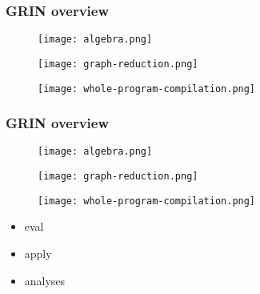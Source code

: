 \documentclass[bigger]{beamer}
\begin{document}
\begin{frame}[fragile]
\frametitle{GRIN overview}
\begin{center}

	\begin{minipage}{0.30\textwidth}
		\begin{figure}
			\texttt{[image: algebra.png]}
		\end{figure}
	\end{minipage}
	\hfill
	\begin{minipage}{0.30\textwidth}
		\begin{figure}
			\texttt{[image: graph-reduction.png]}
		\end{figure}
	\end{minipage}
	\hfill
	\begin{minipage}{0.30\textwidth}
		\begin{figure}
			\texttt{[image: whole-program-compilation.png]}
		\end{figure}
	\end{minipage}

\end{center}
\end{frame}

\begin{frame}[fragile]
\frametitle{GRIN overview}
\begin{center}

	\begin{minipage}{0.30\textwidth}
		\begin{figure}
			\texttt{[image: algebra.png]}
		\end{figure}
	\end{minipage}
	\hfill
	\begin{minipage}{0.30\textwidth}
		\begin{figure}
			\texttt{[image: graph-reduction.png]}
		\end{figure}
	\end{minipage}
	\hfill
	\begin{minipage}{0.30\textwidth}
		\vspace{1cm}
		\begin{figure}
			\texttt{[image: whole-program-compilation.png]}
		\end{figure}
		\vspace{-0.5cm}
		\begin{itemize}
			\item<1-> eval
			\item<2-> apply
			\item<3-> analyses
		\end{itemize}
	\end{minipage}

\end{center}
\end{frame}
\end{document}
